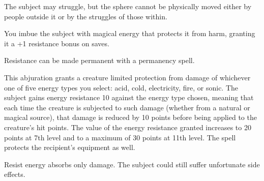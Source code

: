 \begin{multicols}{2}
\begin{small}
\smallskip\noindent The subject may struggle, but the sphere cannot be physically moved either by people outside it or by the struggles of those within.


\noindent You imbue the subject with magical energy that protects it from harm, granting it a +1 resistance bonus on saves.

\smallskip\noindent Resistance can be made permanent with a permanency spell.


\noindent This abjuration grants a creature limited protection from damage of whichever one of five energy types you select: acid, cold, electricity, fire, or sonic. The subject gains energy resistance 10 against the energy type chosen, meaning that each time the creature is subjected to such damage (whether from a natural or magical source), that damage is reduced by 10 points before being applied to the creature's hit points. The value of the energy resistance granted increases to 20 points at 7th level and to a maximum of 30 points at 11th level. The spell protects the recipient's equipment as well.

\smallskip\noindent Resist energy absorbs only damage. The subject could still suffer unfortunate side effects.



\end{small}
\end{multicols}
